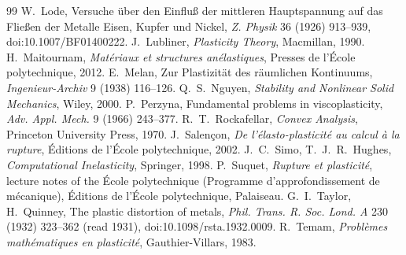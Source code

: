 \begin{chapterbib}{99}
 W.~Lode, Versuche \"uber den Einflu{\ss} der mittleren Hauptspannung auf das Flie{\ss}en der Metalle Eisen, Kupfer und Nickel, \emph{Z. Physik} 36 (1926) 913--939, doi:10.1007/BF01400222.
 J.~Lubliner, \emph{Plasticity Theory}, Macmillan, 1990.
 H.~Maitournam, \emph{Mat\'eriaux et structures an\'elastiques}, Presses de l'\'Ecole polytechnique, 2012.
 E.~Melan, Zur Plastizit\"at des r\"aumlichen Kontinuums, \emph{Ingenieur-Archiv} 9 (1938) 116--126.
 Q.~S.~Nguyen, \emph{Stability and Nonlinear Solid Mechanics}, Wiley, 2000.
 P.~Perzyna, Fundamental problems in viscoplasticity, \emph{Adv. Appl. Mech.} 9 (1966) 243--377.
 R.~T.~Rockafellar, \emph{Convex Analysis}, Princeton University Press, 1970.
 J.~Salen\c{c}on, \emph{De l'\'elasto-plasticit\'e au calcul \`a la rupture}, \'Editions de l'\'Ecole polytechnique, 2002.
 J.~C.~Simo, T.~J.~R.~Hughes, \emph{Computational Inelasticity}, Springer, 1998.
 P.~Suquet, \emph{Rupture et plasticit\'e}, lecture notes of the \'Ecole polytechnique (Programme d'approfondissement de m\'ecanique), \'Editions de l'\'Ecole polytechnique, Palaiseau.
 G.~I.~Taylor, H.~Quinney, The plastic distortion of metals, \emph{Phil. Trans. R. Soc. Lond. A} 230 (1932) 323--362 (read 1931), doi:10.1098/rsta.1932.0009.
 R.~Temam, \emph{Probl\`emes math\'ematiques en plasticit\'e}, Gauthier-Villars, 1983.
\end{chapterbib}
